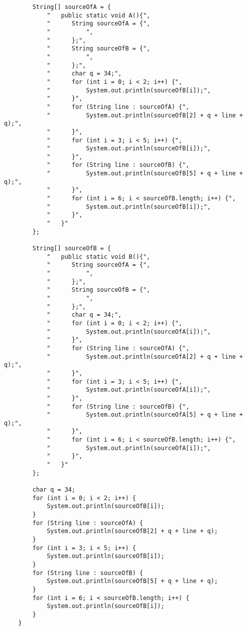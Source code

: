 \documentclass[letterpaper]{article}
\begin{document}
\begin{verbatim}
        String[] sourceOfA = {
            "   public static void A(){",
            "      String sourceOfA = {",
            "          ",
            "      };",
            "      String sourceOfB = {",
            "          ",
            "      };",
            "      char q = 34;",
            "      for (int i = 0; i < 2; i++) {",
            "          System.out.println(sourceOfB[i]);",
            "      }",
            "      for (String line : sourceOfA) {",
            "          System.out.println(sourceOfB[2] + q + line + q);",
            "      }",
            "      for (int i = 3; i < 5; i++) {",
            "          System.out.println(sourceOfB[i]);",
            "      }",
            "      for (String line : sourceOfB) {",
            "          System.out.println(sourceOfB[5] + q + line + q);",
            "      }",
            "      for (int i = 6; i < sourceOfB.length; i++) {",
            "          System.out.println(sourceOfB[i]);",
            "      }",
            "   }"
        };

        String[] sourceOfB = {
            "   public static void B(){",
            "      String sourceOfA = {",
            "          ",
            "      };",
            "      String sourceOfB = {",
            "          ",
            "      };",
            "      char q = 34;",
            "      for (int i = 0; i < 2; i++) {",
            "          System.out.println(sourceOfA[i]);",
            "      }",
            "      for (String line : sourceOfA) {",
            "          System.out.println(sourceOfA[2] + q + line + q);",
            "      }",
            "      for (int i = 3; i < 5; i++) {",
            "          System.out.println(sourceOfA[i]);",
            "      }",
            "      for (String line : sourceOfB) {",
            "          System.out.println(sourceOfA[5] + q + line + q);",
            "      }",
            "      for (int i = 6; i < sourceOfB.length; i++) {",
            "          System.out.println(sourceOfA[i]);",
            "      }",
            "   }"
        };

        char q = 34;
        for (int i = 0; i < 2; i++) {
            System.out.println(sourceOfB[i]);
        }
        for (String line : sourceOfA) {
            System.out.println(sourceOfB[2] + q + line + q);
        }
        for (int i = 3; i < 5; i++) {
            System.out.println(sourceOfB[i]);
        }
        for (String line : sourceOfB) {
            System.out.println(sourceOfB[5] + q + line + q);
        }
        for (int i = 6; i < sourceOfB.length; i++) {
            System.out.println(sourceOfB[i]);
        }
    }


\end{verbatim}
\end{document}
